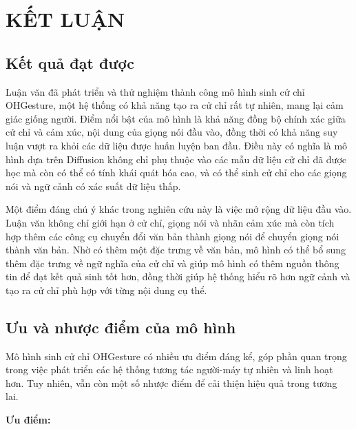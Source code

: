 \chapter{KẾT LUẬN}
\label{Chapter5}

\section{Kết quả đạt được}

Luận văn đã phát triển và thử nghiệm thành công mô hình sinh cử chỉ OHGesture, một hệ thống có khả năng tạo ra cử chỉ rất tự nhiên, mang lại cảm giác giống người. Điểm nổi bật của mô hình là khả năng đồng bộ chính xác giữa cử chỉ và cảm xúc, nội dung của giọng nói đầu vào, đồng thời có khả năng suy luận vượt ra khỏi các dữ liệu được huấn luyện ban đầu. Điều này có nghĩa là mô hình dựa trên Diffusion không chỉ phụ thuộc vào các mẫu dữ liệu cử chỉ đã được học mà còn có thể có tính khái quát hóa cao, và có thể sinh cử chỉ cho các giọng nói và ngữ cảnh có xác suất dữ liệu thấp.

Một điểm đáng chú ý khác trong nghiên cứu này là việc mở rộng dữ liệu đầu vào. Luận văn không chỉ giới hạn ở cử chỉ, giọng nói và nhãn cảm xúc mà còn tích hợp thêm các công cụ chuyển đổi văn bản thành giọng nói để chuyển giọng nói thành văn bản. Nhờ có thêm một đặc trưng về văn bản, mô hình có thể bổ sung thêm đặc trưng về ngữ nghĩa của cử chỉ và giúp mô hình có thêm nguồn thông tin để đạt kết quả sinh tốt hơn, đồng thời giúp hệ thống hiểu rõ hơn ngữ cảnh và tạo ra cử chỉ phù hợp với từng nội dung cụ thể.

\section{Ưu và nhược điểm của mô hình}

Mô hình sinh cử chỉ OHGesture có nhiều ưu điểm đáng kể, góp phần quan trọng trong việc phát triển các hệ thống tương tác người-máy tự nhiên và linh hoạt hơn. Tuy nhiên, vẫn còn một số nhược điểm để cải thiện hiệu quả trong tương lai.

\vspace{10pt}

\textbf{Ưu điểm:}

